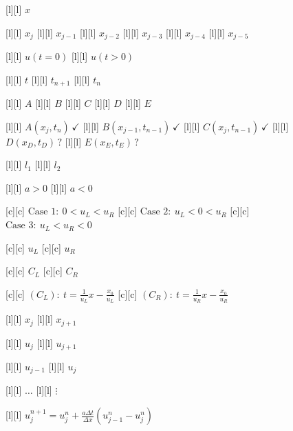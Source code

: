 \begin{figure}[ht]
	\centering
	\footnotesize

	[l] {$x$}

	[l] {$x_{j}$}
	[l] {$x_{j-1}$}
	[l] {$x_{j-2}$}
	[l] {$x_{j-3}$}
	[l] {$x_{j-4}$}
	[l] {$x_{j-5}$}


	[l] {$u(t=0)$}
	[l] {$u(t>0)$}

	[l] {$t$}
	[l] {$t_{n+1}$}
	[l] {$t_{n}$}

	[l] {$A$}
	[l] {$B$}
	[l] {$C$}
	[l] {$D$}
	[l] {$E$}

	[l] {$A(x_j,t_n)\,\checkmark$}
	[l] {$B(x_{j-1},t_{n-1})\,\checkmark$}
	[l] {$C(x_{j},t_{n-1})\,\checkmark$}
	[l] {$D(x_D,t_D)\,?$}
	[l] {$E(x_E,t_E)\, ?$}

	[l] {$l_1$}
	[l] {$l_2$}

	[l] {$a>0$}
	[l] {$a<0$}

	[c] {$\text{Case }1:\ 0 < u_{L} < u_{R}$}
	[c] {$\text{Case }2:\ u_{L} < 0 < u_{R}$}
	[c] {$\text{Case }3:\ u_{L} < u_{R} < 0$}

	[c] {$u_{L}$}
	[c] {$u_{R}$}

	[c] {$C_L$}
	[c] {$C_R$}

	[c] {$\displaystyle (C_L):\ t=\frac{1}{u_{L}}x-\frac{x_{0}}{u_{L}}$}
	[c] {$\displaystyle (C_R):\ t=\frac{1}{u_{R}}x-\frac{x_{0}}{u_{R}}$}

	[l] {$x_{j}$}
	[l] {$x_{j+1}$}

	[l] {$u_{j}$}
	[l] {$u_{j+1}$}

	[l] {$u_{j-1}$}
	[l] {$u_{j}$}

	[l] {$\dots$}
	[l] {$\vdots$}

	[l] {$\displaystyle u_{j}^{n+1} = u_{j}^{n} + \frac{a\Delta t}{\Delta x}\left(u_{j-1}^{n}-u_{j}^{n}\right)$}


\end{figure}
